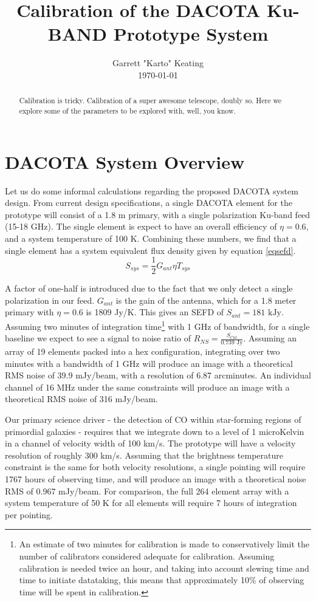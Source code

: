 \documentclass[preprint]{aastex}
\begin{document}
\title{Calibration of the DACOTA Ku-BAND Prototype System}
\author{Garrett "Karto" Keating \\ \today}

\begin{abstract} Calibration is tricky. Calibration of a super awesome telescope, doubly so. Here we explore some of the parameters to be explored with, well, you know.
\end{abstract}

\section{DACOTA System Overview}\label{secoverview}
Let us do some informal calculations regarding the proposed DACOTA system design. From current design specifications, a single DACOTA element for the prototype will consist of a 1.8 m primary, with a single polarization Ku-band feed (15-18 GHz). The single element is expect to have an overall efficiency of $\eta=0.6$, and a system temperature of 100 K. Combining these numbers, we find that a single element has a system equivalent flux density given by equation \ref{eqsefd}.
\begin{equation} \label{eqsefd}
S_{sys}=\frac{1}{2}G_{ant}{\eta}T_{sys}
\end{equation}

\noindent A factor of one-half is introduced due to the fact that we only detect a single polarization in our feed. $G_{ant}$ is the gain of the antenna, which for a 1.8 meter primary with $\eta=0.6$ is 1809 Jy/K. This gives an SEFD of $S_{ant}=181\text{ kJy}$. Assuming two minutes of integration time\footnote{An estimate of two minutes for calibration is made to conservatively limit the number of calibrators considered adequate for calibration. Assuming calibration is needed twice an hour, and taking into account slewing time and time to initiate datataking, this means that approximately 10\% of observing time will be spent in calibration.} with 1 GHz of bandwidth, for a single baseline we expect to see a signal to noise ratio of $R_{NS}=\frac{S_{Cal}}{0.739\text{ Jy}}$. Assuming an array of 19 elements packed into a hex configuration, integrating over two minutes with a bandwidth of 1 GHz will produce an image with a theoretical RMS noise of 39.9 mJy/beam, with a resolution of 6.87 arcminutes. An individual channel of 16 MHz under the same constraints will produce an image with a theoretical RMS noise of 316 mJy/beam. 

Our primary science driver - the detection of CO within star-forming regions of primordial galaxies - requires that we integrate down to a level of 1 microKelvin in a channel of velocity width of 100 km/s. The prototype will have a velocity resolution of roughly 300 km/s. Assuming that the brightness temperature constraint is the same for both velocity resolutions, a single pointing will require 1767 hours of observing time, and will produce an image with a theoretical noise RMS of 0.967 mJy/beam. For comparison, the full 264 element array with a system temperature of 50 K for all elements will require 7 hours of integration per pointing.
\end{document}
